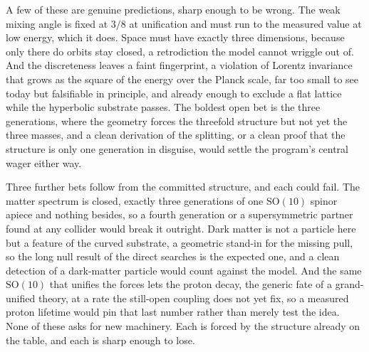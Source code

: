 A few of these are genuine predictions, sharp enough to be wrong. The weak mixing angle is fixed at $3/8$ at unification and must run to the measured value at low energy, which it does. Space must have exactly three dimensions, because only there do orbits stay closed, a retrodiction the model cannot wriggle out of. And the discreteness leaves a faint fingerprint, a violation of Lorentz invariance that grows as the square of the energy over the Planck scale, far too small to see today but falsifiable in principle, and already enough to exclude a flat lattice while the hyperbolic substrate passes. The boldest open bet is the three generations, where the geometry forces the threefold structure but not yet the three masses, and a clean derivation of the splitting, or a clean proof that the structure is only one generation in disguise, would settle the program's central wager either way.

Three further bets follow from the committed structure, and each could fail. The matter spectrum is closed, exactly three generations of one $\mathrm{SO}(10)$ spinor apiece and nothing besides, so a fourth generation or a supersymmetric partner found at any collider would break it outright. Dark matter is not a particle here but a feature of the curved substrate, a geometric stand-in for the missing pull, so the long null result of the direct searches is the expected one, and a clean detection of a dark-matter particle would count against the model. And the same $\mathrm{SO}(10)$ that unifies the forces lets the proton decay, the generic fate of a grand-unified theory, at a rate the still-open coupling does not yet fix, so a measured proton lifetime would pin that last number rather than merely test the idea. None of these asks for new machinery. Each is forced by the structure already on the table, and each is sharp enough to lose.
